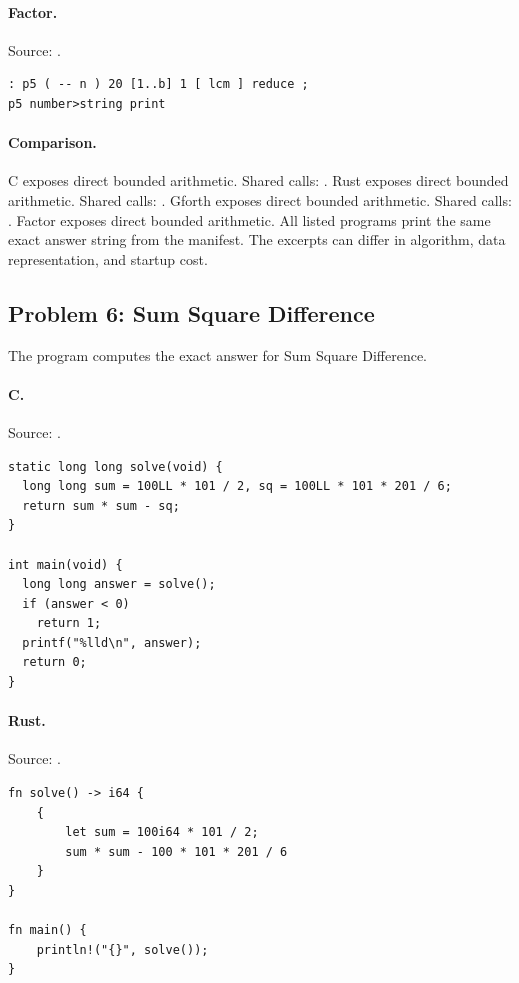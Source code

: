 \paragraph{Factor.} Source: .
\begin{lstlisting}
: p5 ( -- n ) 20 [1..b] 1 [ lcm ] reduce ;
p5 number>string print
\end{lstlisting}

\paragraph{Comparison.}
C exposes direct bounded arithmetic. Shared calls: \texttt{}. Rust exposes direct bounded arithmetic. Shared calls: \texttt{}. Gforth exposes direct bounded arithmetic. Shared calls: \texttt{}. Factor exposes direct bounded arithmetic.
All listed programs print the same exact answer string from the manifest. The excerpts can differ in algorithm, data representation, and startup cost.

\subsection{Problem 6: Sum Square Difference}
\label{walkthrough:p6}
The program computes the exact answer for Sum Square Difference.

\paragraph{C.} Source: .
\begin{lstlisting}
static long long solve(void) {
  long long sum = 100LL * 101 / 2, sq = 100LL * 101 * 201 / 6;
  return sum * sum - sq;
}

int main(void) {
  long long answer = solve();
  if (answer < 0)
    return 1;
  printf("%lld\n", answer);
  return 0;
}
\end{lstlisting}

\paragraph{Rust.} Source: .
\begin{lstlisting}
fn solve() -> i64 {
    {
        let sum = 100i64 * 101 / 2;
        sum * sum - 100 * 101 * 201 / 6
    }
}

fn main() {
    println!("{}", solve());
}
\end{lstlisting}

